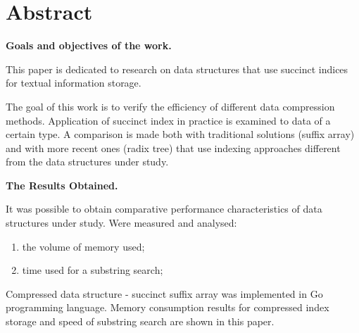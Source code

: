 \newpage
\section*{Abstract}

\textbf{Goals and objectives of the work.}

This paper is dedicated to research on data structures that use succinct indices for textual information storage.

The goal of this work is to verify the efficiency of different data compression methods.
Application of succinct index in practice is examined to data of a certain type.
A comparison is made both with traditional solutions (suffix array) and with more recent ones (radix tree)
that use indexing approaches different from the data structures under study.

\textbf{The Results Obtained.}

It was possible to obtain comparative performance characteristics of data structures under study.
Were measured and analysed:
\begin{enumerate}
    \item the volume of memory used;
    \item time used for a substring search;
\end{enumerate}

Compressed data structure - succinct suffix array was implemented in Go programming language.
Memory consumption results for compressed index storage and speed of substring search are shown in this paper.
